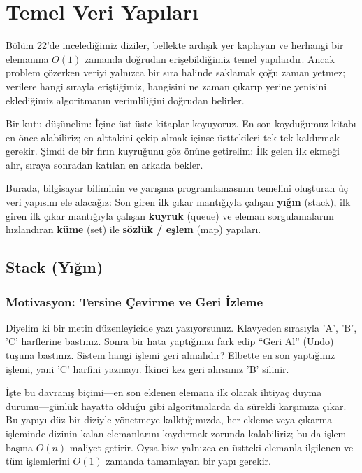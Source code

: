 \chapter[Temel Veri Yapıları · \textit{Temel}]{Temel Veri Yapıları}

Bölüm 22'de incelediğimiz diziler, bellekte ardışık yer kaplayan ve herhangi bir elemanına $O(1)$ zamanda doğrudan erişebildiğimiz temel yapılardır. Ancak problem çözerken veriyi yalnızca bir sıra halinde saklamak çoğu zaman yetmez; verilere hangi sırayla eriştiğimiz, hangisini ne zaman çıkarıp yerine yenisini eklediğimiz algoritmanın verimliliğini doğrudan belirler.

Bir kutu düşünelim: İçine üst üste kitaplar koyuyoruz. En son koyduğumuz kitabı en önce alabiliriz; en alttakini çekip almak içinse üsttekileri tek tek kaldırmak gerekir. Şimdi de bir fırın kuyruğunu göz önüne getirelim: İlk gelen ilk ekmeği alır, sıraya sonradan katılan en arkada bekler.

Burada, bilgisayar biliminin ve yarışma programlamasının temelini oluşturan üç veri yapısını ele alacağız: Son giren ilk çıkar mantığıyla çalışan \textbf{yığın} (stack), ilk giren ilk çıkar mantığıyla çalışan \textbf{kuyruk} (queue) ve eleman sorgulamalarını hızlandıran \textbf{küme} (set) ile \textbf{sözlük / eşlem} (map) yapıları.

\section{Stack (Yığın)}

\subsection{Motivasyon: Tersine Çevirme ve Geri İzleme}
Diyelim ki bir metin düzenleyicide yazı yazıyorsunuz. Klavyeden sırasıyla 'A', 'B', 'C' harflerine bastınız. Sonra bir hata yaptığınızı fark edip ``Geri Al'' (Undo) tuşuna bastınız. Sistem hangi işlemi geri almalıdır? Elbette en son yaptığınız işlemi, yani 'C' harfini yazmayı. İkinci kez geri alırsanız 'B' silinir. 

İşte bu davranış biçimi—en son eklenen elemana ilk olarak ihtiyaç duyma durumu—günlük hayatta olduğu gibi algoritmalarda da sürekli karşımıza çıkar. Bu yapıyı düz bir diziyle yönetmeye kalktığımızda, her ekleme veya çıkarma işleminde dizinin kalan elemanlarını kaydırmak zorunda kalabiliriz; bu da işlem başına $O(n)$ maliyet getirir. Oysa bize yalnızca en üstteki elemanla ilgilenen ve tüm işlemlerini $O(1)$ zamanda tamamlayan bir yapı gerekir.

